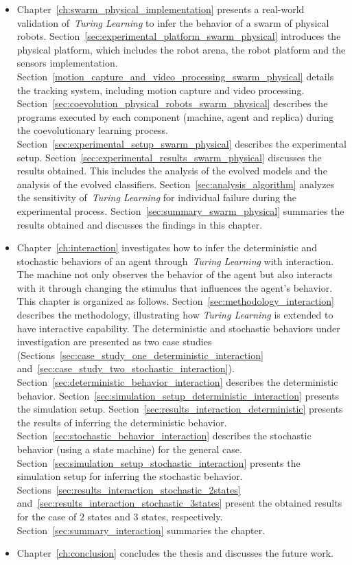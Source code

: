 \begin{itemize}
\item Chapter~\ref{ch:swarm_physical_implementation} presents a real-world validation of~\textit{Turing Learning} to infer the behavior of a swarm of physical robots. Section~\ref{sec:experimental_platform_swarm_physical} introduces the physical platform, which includes the robot arena, the robot platform and the sensors implementation. Section~\ref{motion_capture_and_video_processing_swarm_physical} details the tracking system, including motion capture and video processing. Section~\ref{sec:coevolution_physical_robots_swarm_physical} describes the programs executed by each component (machine, agent and replica) during the coevolutionary learning process. Section~\ref{sec:experimental_setup_swarm_physical} describes the experimental setup. Section~\ref{sec:experimental_results_swarm_physical} discusses the results obtained. This includes the analysis of the evolved models and the analysis of the evolved classifiers. Section~\ref{sec:analysis_algorithm} analyzes the sensitivity of~\textit{Turing Learning} for individual failure during the experimental process. Section~\ref{sec:summary_swarm_physical} summaries the results obtained and discusses the findings in this chapter.

\item Chapter~\ref{ch:interaction} investigates how to infer the deterministic and stochastic behaviors of an agent through~\textit{Turing Learning} with interaction. The machine not only observes the behavior of the agent but also interacts with it through changing the stimulus that influences the agent's behavior. This chapter is organized as follows. Section~\ref{sec:methodology_interaction} describes the methodology, illustrating how \textit{Turing Learning} is extended to have interactive capability. The deterministic and stochastic behaviors under investigation are presented as two case studies (Sections~\ref{sec:case_study_one_deterministic_interaction} and~\ref{sec:case_study_two_stochastic_interaction}). Section~\ref{sec:deterministic_behavior_interaction} describes the deterministic behavior. Section~\ref{sec:simulation_setup_deterministic_interaction} presents the simulation setup. Section~\ref{sec:results_interaction_deterministic} presents the results of inferring the deterministic behavior. Section~\ref{sec:stochastic_behavior_interaction} describes the stochastic behavior (using a state machine) for the general case. Section~\ref{sec:simulation_setup_stochastic_interaction} presents the simulation setup for inferring the stochastic behavior. Sections~\ref{sec:results_interaction_stochastic_2states} and~\ref{sec:results_interaction_stochastic_3states} present the obtained results for the case of $2$ states and $3$ states, respectively. Section~\ref{sec:summary_interaction} summaries the chapter.

\item Chapter~\ref{ch:conclusion} concludes the thesis and discusses the future work. 

\end{itemize}
